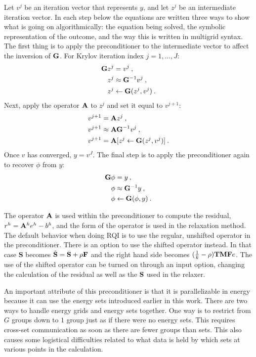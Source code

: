 Let $v^{j}$ be an iteration vector that represents $y$, and let $z^{j}$ be an intermediate iteration vector. In each step below the equations are written three ways to show what is going on algorithmically: the equation being solved, the symbolic representation of the outcome, and the way this is written in multigrid syntax. The first thing is to apply the preconditioner to the intermediate vector to affect the inversion of $\mathbf{G}$. For Krylov iteration index $j = 1, ..., J$:
%
\begin{align}
  \mathbf{G}z^{j} &= v^{j} \:,  \label{eq:invertG} \\
  z^{j} &\approx \mathbf{G}^{-1}v^{j} \:, \nonumber \\
  z^{j} &\leftarrow \mathbf{G}(z^{j}, v^{j}) \:. \nonumber
\end{align}
%
Next, apply the operator $\mathbf{A}$ to $z^{j}$ and set it equal to $v^{j+1}$:
\begin{align}
  v^{j+1} &= \mathbf{A}z^{j} \:,   \label{eq:ApplyA} \\
  v^{j+1} &\approx \mathbf{AG}^{-1}v^{j} \:, \nonumber \\
  v^{j+1} &= \mathbf{A}[z^{j} \leftarrow \mathbf{G}(z^{j}, v^{j})] \:. \nonumber
\end{align}
%
Once $v$ has converged, $y = v^{J}$. The final step is to apply the preconditioner again to recover $\phi$ from $y$:
%
\begin{align}
  \mathbf{G}\phi &= y \:,   \label{eq:findPhi} \\
  \phi &\approx \mathbf{G}^{-1}y \:, \nonumber \\
  \phi &\leftarrow \mathbf{G}(\phi, y) \:. \nonumber
\end{align}

The operator $\mathbf{A}$ is used within the preconditioner to compute the residual, $r^{h} = \mathbf{A}^{h}e^{h} - b^{h}$, and the form of the operator is used in the relaxation method. The default behavior when doing RQI is to use the regular, unshifted operator in the preconditioner. There is an option to use the shifted operator instead. In that case $\mathbf{S}$ becomes $\tilde{\mathbf{S}} = \mathbf{S} + \rho\mathbf{F}$ and the right hand side becomes $(\frac{1}{k} - \rho)\mathbf{TMF}e$. The use of the shifted operator can be turned on through an input option, changing the calculation of the residual as well as the $\mathbf{S}$ used in the relaxer.

An important attribute of this preconditioner is that it is parallelizable in energy because it can use the energy sets introduced earlier in this work. There are two ways to handle energy grids and energy sets together. One way is to restrict from $G$ groups down to $1$ group just as if there were no energy sets. This requires cross-set communication as soon as there are fewer groups than sets. This also causes some logistical difficulties related to what data is held by which sets at various points in the calculation. 


